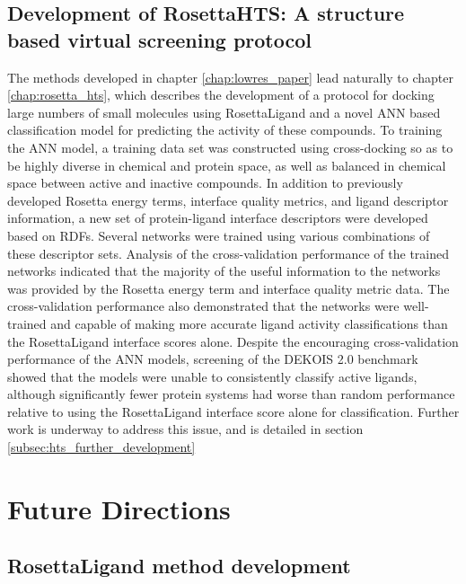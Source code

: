 \subsection{Development of RosettaHTS: A structure based virtual screening protocol}
The methods developed in chapter \ref{chap:lowres_paper} lead naturally to chapter \ref{chap:rosetta_hts}, which describes the development of a protocol for docking large numbers of small molecules using RosettaLigand and a novel \ac{ANN} based classification model for predicting the activity of these compounds.
To training the \ac{ANN} model, a training data set was constructed using cross-docking so as to be highly diverse in chemical and protein space, as well as balanced in chemical space between active and inactive compounds.
In addition to previously developed Rosetta energy terms, interface quality metrics, and ligand descriptor information, a new set of protein-ligand interface descriptors were developed based on \ac{RDF}s.
Several networks were trained using various combinations of these descriptor sets.
Analysis of the cross-validation performance of the trained networks indicated that the majority of the useful information to the networks was provided by the Rosetta energy term and interface quality metric data.
The cross-validation performance also demonstrated that the networks were well-trained and capable of making more accurate ligand activity classifications than the RosettaLigand interface scores alone. 
Despite the encouraging cross-validation performance of the \ac{ANN} models, screening of the DEKOIS 2.0 benchmark showed that the models were unable to consistently classify active ligands, although significantly fewer protein systems had worse than random performance relative to using the RosettaLigand interface score alone for classification.
Further work is underway to address this issue, and is detailed in section \ref{subsec:hts_further_development}

\section{Future Directions}

\subsection{RosettaLigand method development}

